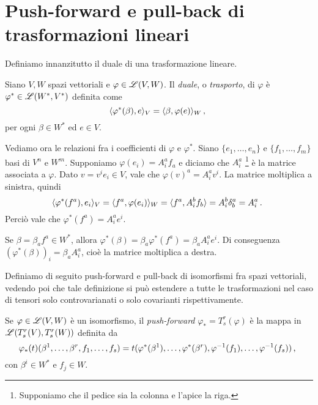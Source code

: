 \section{Push-forward e pull-back di trasformazioni lineari}

Definiamo innanzitutto il duale di una trasformazione lineare.
\begin{definition}  
	Siano $V,W$ spazi vettoriali e $\varphi \in \mathscr L(V,W)$. Il \emph{duale}, o \emph{trasporto}, di $\varphi$ è $\varphi^* \in \mathscr L(W^*,V^*)$ definita come 
	\begin{equation*}
		\langle \varphi^*(\beta) , e \rangle_V = \langle \beta , \varphi(e) \rangle_W \, \text{, } 
	\end{equation*}
	per ogni $\beta \in W^*$ ed $e\in V$.
\end{definition}

Vediamo ora le relazioni fra i coefficienti di $\varphi$ e $\varphi^*$.
Siano $\{e_1,\ldots, e_n\}$ e $\{f_1,\ldots, f_m\}$ basi di $V^n$ e $W^m$. Supponiamo $\varphi(e_i) = A_i^af_a$ e diciamo che $A_i^a$ \footnote{Supponiamo che il pedice sia la colonna e l'apice la riga.} è la matrice associata a $\varphi$.
Dato $v = v^ie_i\in V$, vale che $\varphi(v)^a = A_i^a v^i$.
La matrice moltiplica a sinistra, quindi
\begin{equation*}
	\langle \varphi^*(f^a) , e_i \rangle_V = \langle f^a , \varphi(e_i) \rangle_W = \langle f^a , A_i^b f_b \rangle = A_i^b\delta_b^a = A_i^a\, \text{. }
\end{equation*}
Perciò vale che $\varphi^*(f^a) = A_i^a e^i$.

Se $\beta = \beta_a f^a \in W^*$, allora $\varphi^*(\beta) = \beta_a \varphi^*(f^a) = \beta_aA_i^ae^i$.
Di conseguenza $(\varphi^*(\beta))_i = \beta_aA_i^a$, cioè la matrice moltiplica a destra.


Definiamo di seguito push-forward e pull-back di isomorfismi fra spazi vettoriali, vedendo poi che tale definizione si può estendere a tutte le trasformazioni nel caso di tensori solo controvarianati o solo covarianti rispettivamente.

\begin{definition} 
	Se $\varphi \in \mathscr L(V,W)$ è un isomorfismo, il \emph{push-forward} $\varphi_* = T_s^r(\varphi)$ è la mappa in $\mathscr L(T_s^r(V), T_s^r(W))$ definita da
	\begin{equation*}
		\varphi_*(t) (\beta^1,\ldots,\beta^r,f_1,\ldots,f_s) = t(\varphi^*(\beta^1),\ldots,\varphi^*(\beta^r), \varphi^{-1}(f_1),\ldots, \varphi^{-1}(f_s)) \, \text{, }
	\end{equation*}
	con $\beta^i\in W^*$ e $f_j\in W$.
\end{definition}

